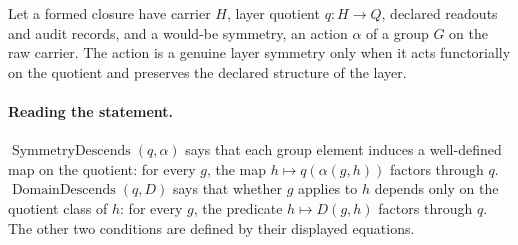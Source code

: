 Let a formed closure have carrier \(H\), layer quotient
\(q:H\to Q\), declared readouts and audit records, and a would-be
symmetry, an action \(\alpha\) of a group \(G\) on the raw carrier.  The
action is a genuine layer symmetry only when it acts functorially on the quotient and
preserves the declared structure of the layer.

\paragraph{Reading the statement.}
\(\operatorname{SymmetryDescends}(q,\alpha)\) says that each group
element induces a well-defined map on the quotient: for every \(g\),
the map \(h\mapsto q(\alpha(g,h))\) factors through \(q\).
\(\operatorname{DomainDescends}(q,D)\) says that whether \(g\) applies
to \(h\) depends only on the quotient class of \(h\): for every \(g\),
the predicate \(h\mapsto D(g,h)\) factors through \(q\). The other two
conditions are defined by their displayed equations.

